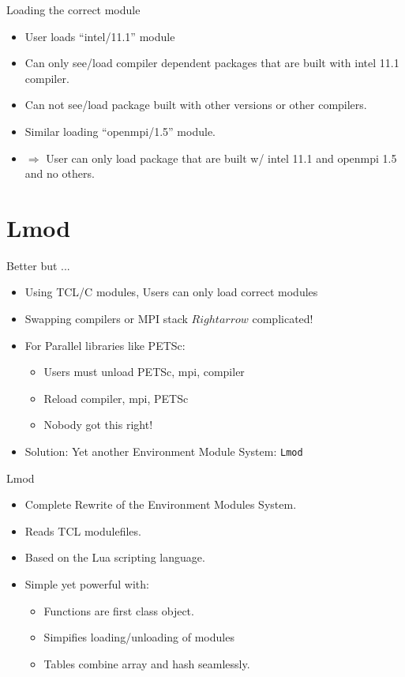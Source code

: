 \documentclass{beamer}
\begin{document}
\begin{frame}{Loading the correct module}
  \begin{itemize}
    \item User loads ``intel/11.1'' module
    \item Can only see/load compiler dependent packages that are built with
      intel 11.1 compiler.
    \item Can not see/load package built with other versions or other compilers.
    \item Similar loading ``openmpi/1.5'' module.
    \item $\Rightarrow$ User can only load package that are built w/ intel 11.1 and openmpi 1.5 and no others.
  \end{itemize}
\end{frame}

\section{Lmod}

\begin{frame}{Better but ...}
  \begin{itemize}
    \item Using TCL/C modules, Users can only load correct modules
    \item Swapping compilers or MPI stack $Rightarrow$ complicated!
    \item For Parallel libraries like PETSc:
      \begin{itemize}
        \item Users must unload PETSc, mpi, compiler
        \item Reload compiler, mpi, PETSc
        \item Nobody got this right!
      \end{itemize}
    \item Solution: Yet another Environment Module System: \texttt{Lmod}
  \end{itemize}
\end{frame}

\begin{frame}{Lmod}
  \begin{itemize}
    \item Complete Rewrite of the Environment Modules System.
    \item Reads TCL modulefiles.
    \item Based on the Lua scripting language.
    \item Simple yet powerful with:
      \begin{itemize}
        \item Functions are first class object.
        \item Simpifies loading/unloading of modules
        \item Tables combine array and hash seamlessly.
      \end{itemize}
  \end{itemize}
\end{frame}
\end{document}
